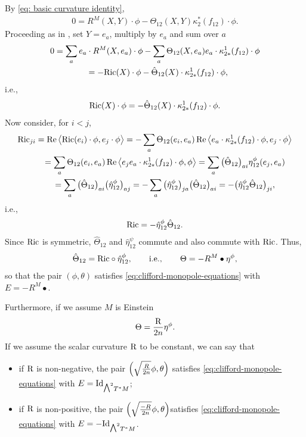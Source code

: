 \documentclass[pdftex]{sigma}
\newcommand{\ext}{\raise1pt\hbox{\small$\bigwedge$}}
\numberwithin{equation}{section}
\begin{document}
By \eqref{eq: basic curvature identity},
\begin{gather*}
0 = R^M(X,Y)\cdot \phi - \Theta_{12}(X,Y)\kappa_{2}^*(f_{12})\cdot \phi.
\end{gather*}
Proceeding as in \cite{Friedrich}, set $Y=e_a$, multiply by $e_a$ and sum over $a$
\begin{gather*}
0 = \sum_a e_a\cdot R^M(X,e_a)\cdot \phi - \sum_a \Theta_{12}(X,e_a)e_a\cdot\kappa_{2*}^1(f_{12})\cdot \phi\\
\hphantom{0}{}= -{\rm Ric}(X)\cdot \phi -\hat\Theta_{12}(X)\cdot \kappa_{2*}^1(f_{12})\cdot \phi,
\end{gather*}
i.e.,
\begin{gather*}
{\rm Ric}(X)\cdot \phi = -\hat\Theta_{12}(X)\cdot \kappa_{2*}^1(f_{12})\cdot \phi.
\end{gather*}
Now consider, for $i<j$,
\begin{gather*}
{\rm Ric}_{ji} =\operatorname{Re}\big\langle {\rm Ric}(e_i)\cdot \phi , e_j \cdot \phi\big\rangle =
 -\sum_a \Theta_{12}(e_i,e_a) \operatorname{Re}\big\langle e_a \cdot\kappa_{2*}^1(f_{12})\cdot \phi, e_j\cdot \phi\big\rangle \\
\hphantom{{\rm Ric}_{ji}}{} =
 \sum_a \Theta_{12}(e_i,e_a) \operatorname{Re}\big\langle e_je_a \cdot\kappa_{2*}^1(f_{12})\cdot \phi, \phi\big\rangle
 = \sum_a \big(\hat\Theta_{12}\big)_{ai} \eta_{12}^\phi(e_j,e_a) \\
\hphantom{{\rm Ric}_{ji}}{}
 = \sum_a \big(\hat\Theta_{12}\big)_{ai} \big(\hat\eta_{12}^\phi\big)_{aj} =- \sum_a \big(\hat\eta_{12}^\phi\big)_{ja}\big(\hat\Theta_{12}\big)_{ai} = - \big(\hat\eta_{12}^\phi\hat\Theta_{12}\big)_{ji} ,
\end{gather*}
i.e.,
\begin{gather*}
{\rm Ric} = -\hat\eta_{12}^\phi\hat\Theta_{12}.
\end{gather*}
Since ${\rm Ric}$ is symmetric, $\hat\Theta_{12}$ and $\hat\eta_{12}^\psi$ commute and also commute with ${\rm Ric}$.
Thus,
\begin{gather*}\hat\Theta_{12}= {\rm Ric}\circ\hat\eta_{12}^\phi,\qquad \text{i.e.},
\qquad \Theta= -R^M\bullet\eta^\phi,\end{gather*}
so that the pair $(\phi,\theta)$ satisfies \eqref{eq:clifford-monopole-equations} with $E=-R^M\bullet$.

Furthermore, if we assume $M$ is Einstein
\begin{gather*}
\Theta ={{\rm R}\over 2n}\eta^\phi.
\end{gather*}
If we assume the scalar curvature ${\rm R}$ to be constant, we can say that
\begin{itemize}\itemsep=0pt
\item if ${\rm R}$ is non-negative, the pair $\Big(\sqrt{{R\over 2n}}\phi, \theta\Big)$ satisfies \eqref{eq:clifford-monopole-equations} with $E={\rm Id}_{\ext^2T^*M}$;
\item if ${\rm R}$ is non-positive, the pair $\Big(\sqrt{{-R\over 2n}}\phi, \theta\Big)$satisfies \eqref{eq:clifford-monopole-equations} with $E=-{\rm Id}_{\ext^2T^*M}$.
\end{itemize}
\end{document}
